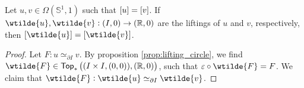 \begin{corollary}
	Let $u,v \in \Omega(\mathbb{S}^1,1)$ such that $\sbr{u} = \sbr{v}$. If $\wtilde{u},\wtilde{v} : (I,0) \to (\mathbb{R},0)$ are the liftings of $u$ and $v$, respectively, then $\sbr[0]{\wtilde{u}} = \sbr[0]{\wtilde{v}}$.
\end{corollary}

\begin{proof}
	Let $F : u \simeq_{\partial I} v$. By proposition \ref{prop:lifting_circle}, we find $\wtilde{F} \in \mathsf{Top}_\ast\del[1]{(I \times I, (0,0)),(\mathbb{R},0)}$, such that $\varepsilon \circ \wtilde{F} = F$. We claim that $\wtilde{F} : \wtilde{u} \simeq_{\partial I} \wtilde{v}$.
\end{proof}
